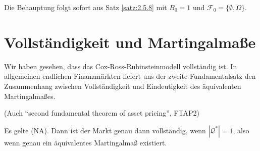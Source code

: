 \documentclass[a4paper,twoside,DIV15,BCOR12mm]{scrbook}
\newcommand{\cF}{\mathcal F}
\newcommand{\cQ}{\mathcal Q}
\begin{document}
\begin{beweis}
Die Behauptung folgt sofort aus Satz \ref{satz:2.5.8} mit $B_0=1$ und $\cF_0=\{\emptyset, \Omega\}$.
\end{beweis}

\section{Vollständigkeit und Martingalmaße}

Wir haben gesehen, dass das Cox-Ross-Rubinsteinmodell vollständig ist. In allgemeinen endlichen Finanzmärkten liefert uns der zweite Fundamentalsatz den Zusammenhang zwischen Vollständigkeit und Eindeutigkeit des äquivalenten Martingalmaßes.

\begin{satz}
(Auch “second fundamental theorem of asset pricing”, FTAP2)\label{satz:2.6.1}

Es gelte (NA). Dann ist der Markt genau dann vollständig, wenn $|\cQ^*|=1$, also wenn genau ein äquivalentes Martingalmaß existiert.
\end{satz}
\end{document}
